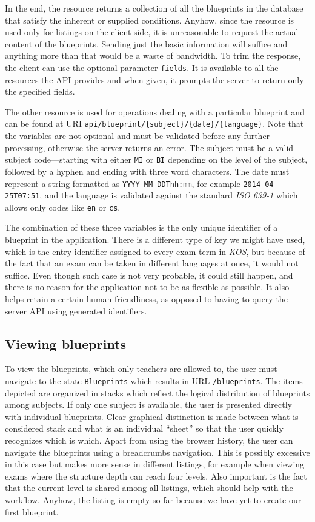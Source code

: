 \documentclass[thesis=M,english,hidelinks]{FITthesis}[2012/10/20]
\newcommand{\code}{\texttt}
\begin{document}
In the end, the resource returns a collection of all the blueprints in the database that satisfy the inherent or supplied conditions. Anyhow, since the resource is used only for listings on the client side, it is unreasonable to request the actual content of the blueprints. Sending just the basic information will suffice and anything more than that would be a waste of bandwidth. To trim the response, the client can use the optional parameter \code{fields}. It is available to all the resources the API provides and when given, it prompts the server to return only the specified fields.

The other resource is used for operations dealing with a particular blueprint and can be found at URI \code{api/blueprint/\{subject\}/\{date\}/\{language\}}. Note that the variables are not optional and must be validated before any further processing, otherwise the server returns an error. The subject must be a valid subject code---starting with either \code{MI} or \code{BI} depending on the level of the subject, followed by a hyphen and ending with three word characters. The date must represent a string formatted as \code{YYYY-MM-DDThh:mm}, for example \code{2014-04-25T07:51}, and the language is validated against the standard \textit{ISO 639-1} which allows only codes like \code{en} or \code{cs}.

The combination of these three variables is the only unique identifier of a blueprint in the application. There is a different type of key we might have used, which is the entry identifier assigned to every exam term in \textit{KOS}, but because of the fact that an exam can be taken in different languages at once, it would not suffice. Even though such case is not very probable, it could still happen, and there is no reason for the application not to be as flexible as possible. It also helps retain a certain human-friendliness, as opposed to having to query the server API using generated identifiers.

    \subsection{Viewing blueprints}

To view the blueprints, which only teachers are allowed to, the user must navigate to the state \code{Blueprints} which results in URL \code{/blueprints}. The items depicted are organized in stacks which reflect the logical distribution of blueprints among subjects. If only one subject is available, the user is presented directly with individual blueprints. Clear graphical distinction is made between what is considered stack and what is an individual ``sheet'' so that the user quickly recognizes which is which. Apart from using the browser history, the user can navigate the blueprints using a breadcrumbs navigation. This is possibly excessive in this case but makes more sense in different listings, for example when viewing exams where the structure depth can reach four levels. Also important is the fact that the current level is shared among all listings, which should help with the workflow. Anyhow, the listing is empty so far because we have yet to create our first blueprint.
\end{document}
